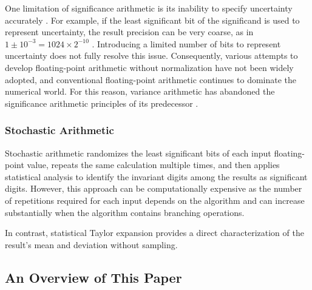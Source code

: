 \documentclass[twoside]{article}
\numberwithin{equation}{section}
\begin{document}
One limitation of significance arithmetic is its inability to specify uncertainty accurately \cite{Prev_Precision_Arithmetic}.
For example, if the least significant bit of the significand is used to represent uncertainty,  the result precision can be very coarse, as in $1 \pm 10^{-3} = 1024 \times 2^{-10}$  \cite{Prev_Precision_Arithmetic}.
Introducing a limited number of bits to represent uncertainty does not fully resolve this issue.
Consequently, various attempts to develop  floating-point arithmetic without normalization \cite{Unnormalized_Arithmetic} have not been widely adopted, and conventional floating-point arithmetic continues to dominate the numerical world.
For this reason, variance arithmetic has abandoned the significance arithmetic principles of its predecessor \cite{Prev_Precision_Arithmetic}.



\subsubsection{Stochastic Arithmetic}

Stochastic arithmetic \cite{Stochastic_Arithmetic}\cite{CADNA_library} randomizes the least significant bits of each input floating-point value, repeats the same calculation multiple times, and then applies statistical analysis to identify the invariant digits among the results as significant digits.  
However, this approach can be computationally expensive as the number of repetitions required for each input depends on the algorithm and can increase substantially when the algorithm contains branching operations.  

In contrast, statistical Taylor expansion provides a direct characterization of the result's mean and deviation without sampling.






\subsection{ An Overview of This Paper}
\end{document}
